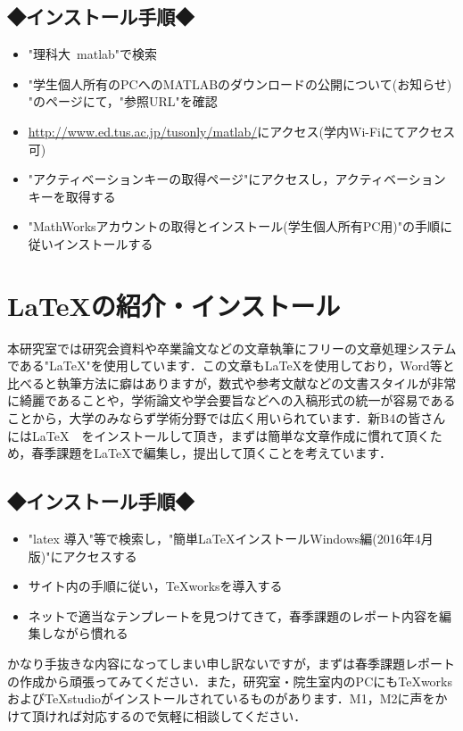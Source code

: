 \documentclass[autodetect-engine,dvipdfmx-if-dvi,ja=standard,a4paper,11pt]{bxjsarticle} %
\begin{document}
\subsection*{◆インストール手順◆}
\begin{itemize}
\item "理科大~matlab"で検索
\item "学生個人所有のPCへのMATLABのダウンロードの公開について(お知らせ) "のページにて，"参照URL"を確認
\item \url{http://www.ed.tus.ac.jp/tusonly/matlab/}にアクセス(学内Wi-Fiにてアクセス可)
\item "アクティベーションキーの取得ページ"にアクセスし，アクティベーションキーを取得する
\item "MathWorksアカウントの取得とインストール(学生個人所有PC用)"の手順に従いインストールする
\end{itemize}

\section{\LaTeX の紹介・インストール}
本研究室では研究会資料や卒業論文などの文章執筆にフリーの文章処理システムである"\LaTeX"を使用しています．この文章も\LaTeX を使用しており，Word等と比べると執筆方法に癖はありますが，数式や参考文献などの文書スタイルが非常に綺麗であることや，学術論文や学会要旨などへの入稿形式の統一が容易であることから，大学のみならず学術分野では広く用いられています．新B4の皆さんには\LaTeX　をインストールして頂き，まずは簡単な文章作成に慣れて頂くため，春季課題を\LaTeX で編集し，提出して頂くことを考えています．

\subsection*{◆インストール手順◆}
\begin{itemize}
\item "latex 導入"等で検索し，"簡単LaTeXインストールWindows編(2016年4月版)"\cite{Latex}にアクセスする
\item サイト内の手順に従い，TeXworksを導入する
\item ネットで適当なテンプレートを見つけてきて，春季課題のレポート内容を編集しながら慣れる
\end{itemize}
かなり手抜きな内容になってしまい申し訳ないですが，まずは春季課題レポートの作成から頑張ってみてください．また，研究室・院生室内のPCにもTeXworksおよびTeXstudioがインストールされているものがあります．M1，M2に声をかけて頂ければ対応するので気軽に相談してください．
\newpage
\end{document}
